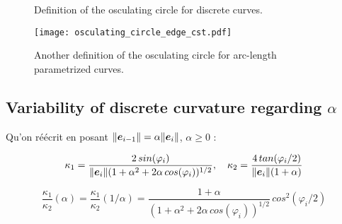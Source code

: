 \begin{figure}[h]
     \centering
     \caption{Definition of the osculating circle for discrete curves.}
     \label{steady_state}
\end{figure}

\begin{figure}[H]
\begin{center}
\texttt{[image: osculating\_circle\_edge\_cst.pdf]}
\caption{Another definition of the osculating circle for arc-length parametrized curves.}
\label{fig:1_1}
\end{center}
\end{figure}

\subsection{Variability of discrete curvature regarding $\alpha$}

Qu'on réécrit en posant $\|\boldsymbol{e}_{i-1}\| = \alpha \|\boldsymbol{e}_{i} \|$, $\alpha \geq 0$ :

\begin{equation}
	\kappa_1 = \frac{2 \,sin(\varphi_i)}{\|\boldsymbol{e}_{i}\|(1+ \alpha^2 + 2 \alpha \, cos(\varphi_i))^{1/2}},
	\quad
	\kappa_2 = \frac{4 \,tan(\varphi_i/2)}{\|\boldsymbol{e}_{i}\|(1+\alpha)}
\end{equation}

\begin{equation}
	\frac{\kappa_1}{\kappa_2}(\alpha) = \frac{\kappa_1}{\kappa_2}(1/\alpha)= \frac{1+\alpha}{(1+ \alpha^2 + 2 \alpha \, cos(\varphi_i))^{1/2}} \, cos^2(\varphi_i/2)
\end{equation}

